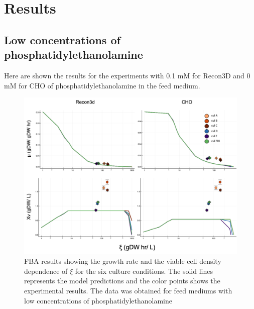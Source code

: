 \documentclass[]{article}
\begin{document}
\section{Results} %

\subsection{Low concentrations of phosphatidylethanolamine} %

		Here are shown the results for the experiments with 0.1 mM for Recon3D and 0 mM for CHO of phosphatidylethanolamine in the feed medium.
		
	\begin{figure}[h]
		\includegraphics[scale = 0.5]{low_medium_1}
		\caption{FBA results showing the growth rate and the viable cell density dependence of $\xi$ for the six culture conditions. The solid lines represents the model predictions and the color points shows the experimental results. The data was obtained for feed mediums with low concentrations of phosphatidylethanolamine}
		
	\end{figure}
	
\end{document}
